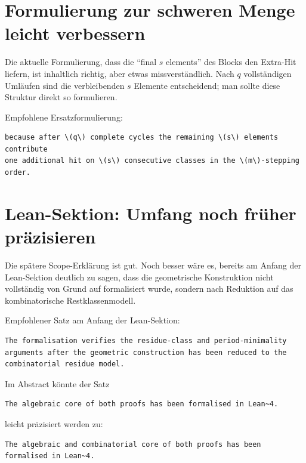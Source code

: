 \documentclass[11pt]{article}
\begin{document}
\section{Formulierung zur schweren Menge leicht verbessern}

Die aktuelle Formulierung, dass die ``final \(s\) elements'' des Blocks den Extra-Hit liefern, ist inhaltlich richtig, aber etwas missverständlich. Nach \(q\) vollständigen Umläufen sind die verbleibenden \(s\) Elemente entscheidend; man sollte diese Struktur direkt so formulieren.

Empfohlene Ersatzformulierung:

\begin{lstlisting}[language={[LaTeX]TeX}]
because after \(q\) complete cycles the remaining \(s\) elements contribute
one additional hit on \(s\) consecutive classes in the \(m\)-stepping order.
\end{lstlisting}

\section{Lean-Sektion: Umfang noch früher präzisieren}

Die spätere Scope-Erklärung ist gut. Noch besser wäre es, bereits am Anfang der Lean-Sektion deutlich zu sagen, dass die geometrische Konstruktion nicht vollständig von Grund auf formalisiert wurde, sondern nach Reduktion auf das kombinatorische Restklassenmodell.

Empfohlener Satz am Anfang der Lean-Sektion:

\begin{lstlisting}[language={[LaTeX]TeX}]
The formalisation verifies the residue-class and period-minimality
arguments after the geometric construction has been reduced to the
combinatorial residue model.
\end{lstlisting}

Im Abstract könnte der Satz

\begin{lstlisting}[language={[LaTeX]TeX}]
The algebraic core of both proofs has been formalised in Lean~4.
\end{lstlisting}

leicht präzisiert werden zu:

\begin{lstlisting}[language={[LaTeX]TeX}]
The algebraic and combinatorial core of both proofs has been formalised in Lean~4.
\end{lstlisting}
\end{document}
